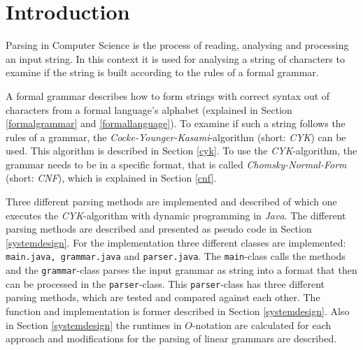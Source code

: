 \documentclass[a4paper, 11pt]{article}
\begin{document}
\setcounter{page}{1}


\begin{spacing}{1}


\newpage
\fancyhead[LO]{\empty}
{
  \hypersetup{linkcolor=black}
  \tableofcontents
}

\end{spacing}

\newpage















\section{Introduction}

Parsing in Computer Science is the process  of reading, analysing and processing an input string. In this context it is used for analysing a string of characters to examine if the string is built according to the rules of a formal grammar. 

A formal grammar describes how to form strings with correct syntax out of characters from a formal language's alphabet (explained in Section \ref{formalgrammar} and \ref{formallanguage}).
To examine if such a string follows the rules of a grammar, the \textit{Cocke-Younger-Kasami}-algorithm (short: \textit{CYK}) can be used. This algorithm is described in Section \ref{cyk}. To use the \textit{CYK}-algorithm, the grammar needs to be in a specific format, that is called \textit{Chomsky-Normal-Form} (short: \textit{CNF}), which is explained in Section \ref{cnf}. \cite{CYK_name, CYK1}


Three different parsing methods are implemented and described of which one executes the \textit{CYK}-algorithm with dynamic programming in \textit{Java}. The different parsing methods are described and presented as pseudo code in Section \ref{systemdesign}.
For the implementation three different classes are implemented: \texttt{main.java, grammar.java} and \texttt{parser.java}. The \texttt{main}-class calls the methods and the \texttt{grammar}-class parses the input grammar as string into a format that then can be processed in the \texttt{parser}-class. This \texttt{parser}-class has three different parsing methods, which are tested and compared against each other.
The function and implementation is former described in Section \ref{systemdesign}. Also in Section \ref{systemdesign} the runtimes in $O$-notation are calculated for each approach and modifications for the parsing of linear grammars are described.
\end{document}
